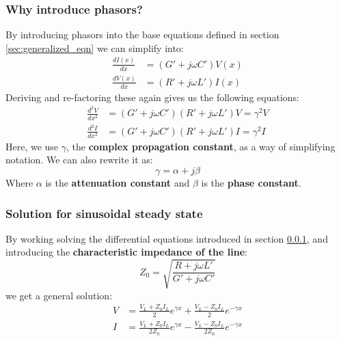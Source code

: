 \documentclass[../transmission.tex]{subfiles}
\begin{document}
			\subsubsection{Why introduce phasors?}
				\label{sec:why_phasors}
				By introducing phasors into the base equations defined in section \ref{sec:generalized_eqn} we can simplify into:
				\begin{align}
					\frac{dI(x)}{dx}&=(G'+j\omega C')V(x)\\
					\frac{dV(x)}{dx}&=(R'+j\omega L')I(x)
				\end{align}
				Deriving and re-factoring these again gives us the following equations:
				\begin{align}
					\frac{d^2V}{dx^2}&=(G'+j\omega C')(R'+j\omega L')V =\gamma^2V\\
					\frac{d^2I}{dx^2}&=(G'+j\omega C')(R'+j\omega L')I = \gamma^2I
				\end{align}
				Here, we use $\gamma$, the \textbf{complex propagation constant}, as a way of simplifying notation. We can also rewrite it as:
				\begin{equation}
					\gamma = \alpha +j\beta
				\end{equation}
				Where $\alpha$ is the \textbf{attenuation constant} and $\beta$ is the \textbf{phase constant}.
			
			\subsubsection{Solution for sinusoidal steady state}
				By working solving the differential equations introduced in section \ref{sec:why_phasors}, and introducing the \textbf{characteristic impedance of the line}:
				\begin{equation}
					Z_0 = \sqrt{\frac{R+j\omega L'}{G'+j\omega C'}}
				\end{equation}
				we get a general solution:
				\begin{align}
					V&=\frac{V_L+Z_0I_L}{2}e^{\gamma x}+\frac{V_L-Z_0I_L}{2}e^{-\gamma x}\\
					I&=\frac{V_L+Z_0I_L}{2Z_0}e^{\gamma x}-\frac{V_L-Z_0I_L}{2Z_0}e^{-\gamma x}
				\end{align}
\end{document}
